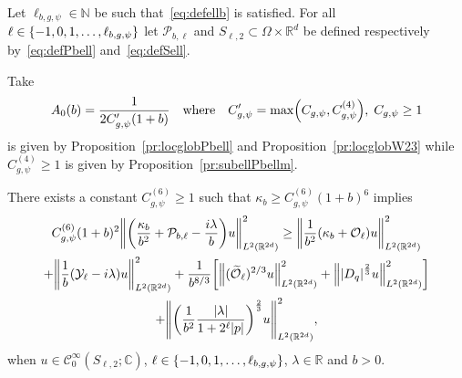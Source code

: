 \documentclass[10pt]{amsart}
\theoremstyle{definition}\newtheorem{defi}[theo]{Definition}\newtheorem{rema}[theo]{Remark}\newtheorem{exam}[theo]{Example}\newtheorem{exem}[theo]{Example}\newtheorem{nota}[theo]{Notation}
\newcommand{\C}{\mathbb{C}}
\newcommand{\R}{\mathbb{R}}
\newcommand{\N}{\mathbb{N}}
\newcommand{\clC}{\mathcal{C}}
\newcommand{\clY}{\mathcal{Y}}
\newcommand{\clO}{\mathcal{O}}
\newcommand{\clP}{\mathcal{P}}
\let\oldtilde\tilde
\renewcommand*{\tilde}[1]{\mathchoice{\widetilde{#1}}{\widetilde{#1}}{\oldtilde{#1}}{\oldtilde{#1}}}
\let\originalleft\left
\let\originalright\right
\renewcommand{\left}{\mathopen{}\mathclose\bgroup\originalleft}
\renewcommand{\right}{\aftergroup\egroup\originalright}
\begin{document}
\begin{prop}\label{pr:subellPbellSmall}
Let $\ell_{b,g,\psi}\in\N$ be such that~\eqref{eq:defellb} is satisfied. For all $\ell\in \left\{-1,0,1,\dots,\ell_{b,g,\psi}\right\}$ let $\clP_{b,\ell}$ and $S_{\ell,2}\subset \Omega\times \R^{d}$ be defined respectively by~\eqref{eq:defPbell} and~\eqref{eq:defSell}.

Take
\[
A_0(b)=\frac{1}{2C_{{g,\psi}}'(1+b)}\quad\text{where}\quad C_{{g,\psi}}'=\max\left(C_{g,\psi},C_{g,\psi}^{(4)}\right),\; C_{g,\psi}\geq 1
\]
is given by Proposition~\ref{pr:locglobPbell} and Proposition~\ref{pr:locglobW23} while $C_{g,\psi}^{(4)}\geq 1$ is given by Proposition~\ref{pr:subellPbellm}.

There exists a constant $C_{g,\psi}^{(6)}\geq 1$ such that $\kappa_{b}\geq C_{g,\psi}^{(6)}(1+b)^{6}$ implies
\begin{multline}\label{eq:subellPbellSmall}
C_{g,\psi}^{(6)}(1+b)^2
\left\| \left(\frac{\kappa_{b}}{b^{2}} + \clP_{b,\ell} - \frac{i\lambda}{b} \right) u \right\|_{L^2(\R^{2d})}^{2} 
\geq \left\| \frac{1}{b^2}\left(\kappa_b+\clO_{\ell}\right) u\right\|_{L^2(\R^{2d})}^2\\
+\left\| \frac{1}{b}\left(\clY_{\ell}-i \lambda \right)u \right\|_{L^2(\R^{2d})}^2
+\frac{1}{b^{8/3}}\left[\left\|(\tilde{\clO}_{\ell})^{2/3} u\right\|_{L^2(\R^{2d})}^2+ \left\|\left|D_{q} \right|^{\frac{2}{3}} u \right\|_{L^2(\R^{{2d}})}^{2}\right]
\\+ \left\| \left(\frac{1}{b^2} \frac{|\lambda|}{1+2^{\ell}|p|} \right)^{\frac{2}{3}} u \right\|_{L^2(\R^{2d})}^{2} ,
\end{multline}
when $ u \in \clC^\infty_0(S_{\ell,2};\C)$, $\ell\in \left\{-1,0,1,\dots,\ell_{b,g,\psi}\right\}$, $\lambda\in \R$ and $b>0$.
\end{prop}
\end{document}
